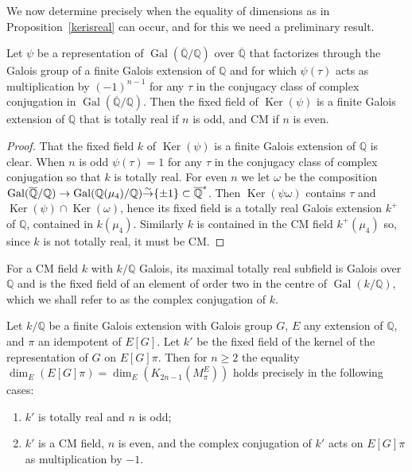 \documentclass{amsart}
\begin{document}
We now determine precisely when the equality of dimensions as in Proposition~\ref{kerisreal} can occur,
and for this we need a preliminary result.

\begin{prop}\label{CMprop}
Let $ \psi $ be a representation of $ {\operatorname{Gal}}({\overline{\mathbb Q}}/{\mathbb Q}) $ over $ {\overline{\mathbb Q}} $ that factorizes through the Galois group of a finite Galois extension
of $ {\mathbb Q} $ and for which $ \psi({\tau}) $ acts as multiplication by $ (-1)^{n-1} $ for any $ {\tau} $ in the conjugacy
class of complex conjugation in $ {\operatorname{Gal}}({\overline{\mathbb Q}}/{\mathbb Q}) $.
Then the fixed field of $ {\operatorname{Ker}}(\psi) $ is a finite Galois extension of $ {\mathbb Q} $ that is totally real if
$ n $ is odd, and CM if $ n $ is even.
\end{prop}

\begin{proof}
That the fixed field $ k $ of $ {\operatorname{Ker}}(\psi) $ is a finite Galois extension of $ {\mathbb Q} $ is clear.
When $ n $ is odd $ \psi({\tau})=1 $ for any $ {\tau} $ in the conjugacy class
of complex conjugation so that $ k $ is totally real.
For even $ n $ we let $ \omega $ be the composition
$ {\operatorname{Gal}}({\overline{\mathbb Q}}/{\mathbb Q}) \to {\operatorname{Gal}}({\mathbb Q}(\mu_4)/{\mathbb Q}) {\buildrel{\sim}\over{\rightarrow}} \{\pm1\} \subset {\overline{\mathbb Q}}^* $.
Then $ {\operatorname{Ker}}(\psi\omega) $ contains $ {\tau} $ and $ {\operatorname{Ker}}(\psi) \cap {\operatorname{Ker}}(\omega) $,
hence its fixed field is a totally real Galois extension $ k^+ $ of $ {\mathbb Q} $, contained in $ k(\mu_4) $.
Similarly $ k $ is contained in the CM field $ k^+(\mu_4) $ so, since $ k $ is not totally real, it must
be CM.
\end{proof}

\begin{remark}\label{CM}
For a CM field $ k $ with $ k/{\mathbb Q} $ Galois, its maximal totally real subfield is Galois
over $ {\mathbb Q} $ and is the fixed field of an element of order two in the centre of $ {\operatorname{Gal}}(k/{\mathbb Q}) $,
which we shall refer to as the complex conjugation of $ k $.
\end{remark}

\begin{proposition}\label{whenconj}
Let $ k/{\mathbb Q} $ be a finite Galois extension with Galois group $ G $, $ E $ any extension of $ {\mathbb Q} $, and
$ \pi $ an idempotent of $ E[G] $.  Let $ k' $ be the fixed field of the kernel of the
representation of $ G $ on $ E[G] \pi $.
Then for $ n \ge 2 $ the equality $ \dim_E(E[G]\pi) = \dim_E({{K_{2n-1}(M_\pi^E)}}) $ holds precisely in the following
cases:
\begin{enumerate}
\item
$ k' $ is totally real and $ n $ is odd;

\item
$ k' $ is a CM field, $ n $ is even, and the complex conjugation of $ k' $ acts on $ E[G] \pi $ as multiplication by $ -1 $.
\end{enumerate}
\end{proposition}
\end{document}
